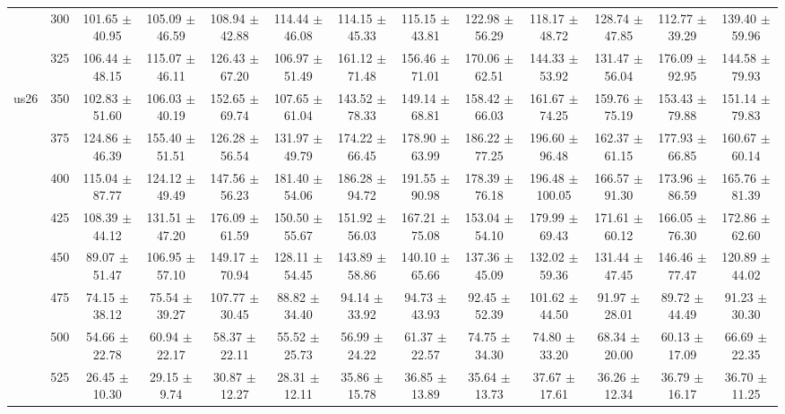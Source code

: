 \begin{table}[h]
{\begin{tabular}{
        ccccccccccccc}
 & 300& 101.65 $\pm$ 40.95& 105.09 $\pm$ 46.59& 108.94 $\pm$ 42.88& 114.44 $\pm$ 46.08& 114.15 $\pm$ 45.33& 115.15 $\pm$ 43.81& 122.98 $\pm$ 56.29& 118.17 $\pm$ 48.72& 128.74 $\pm$ 47.85& 112.77 $\pm$ 39.29& 139.40 $\pm$ 59.96 \\ 
 & 325& 106.44 $\pm$ 48.15& 115.07 $\pm$ 46.11& 126.43 $\pm$ 67.20& 106.97 $\pm$ 51.49& 161.12 $\pm$ 71.48& 156.46 $\pm$ 71.01& 170.06 $\pm$ 62.51& 144.33 $\pm$ 53.92& 131.47 $\pm$ 56.04& 176.09 $\pm$ 92.95& 144.58 $\pm$ 79.93 \\ 
\multirow{4}{*}{us26}& 350& 102.83 $\pm$ 51.60& 106.03 $\pm$ 40.19& 152.65 $\pm$ 69.74& 107.65 $\pm$ 61.04& 143.52 $\pm$ 78.33& 149.14 $\pm$ 68.81& 158.42 $\pm$ 66.03& 161.67 $\pm$ 74.25& 159.76 $\pm$ 75.19& 153.43 $\pm$ 79.88& 151.14 $\pm$ 79.83 \\ 
 & 375& 124.86 $\pm$ 46.39& 155.40 $\pm$ 51.51& 126.28 $\pm$ 56.54& 131.97 $\pm$ 49.79& 174.22 $\pm$ 66.45& 178.90 $\pm$ 63.99& 186.22 $\pm$ 77.25& 196.60 $\pm$ 96.48& 162.37 $\pm$ 61.15& 177.93 $\pm$ 66.85& 160.67 $\pm$ 60.14 \\ 
 & 400& 115.04 $\pm$ 87.77& 124.12 $\pm$ 49.49& 147.56 $\pm$ 56.23& 181.40 $\pm$ 54.06& 186.28 $\pm$ 94.72& 191.55 $\pm$ 90.98& 178.39 $\pm$ 76.18& 196.48 $\pm$ 100.05& 166.57 $\pm$ 91.30& 173.96 $\pm$ 86.59& 165.76 $\pm$ 81.39 \\ 
 & 425& 108.39 $\pm$ 44.12& 131.51 $\pm$ 47.20& 176.09 $\pm$ 61.59& 150.50 $\pm$ 55.67& 151.92 $\pm$ 56.03& 167.21 $\pm$ 75.08& 153.04 $\pm$ 54.10& 179.99 $\pm$ 69.43& 171.61 $\pm$ 60.12& 166.05 $\pm$ 76.30& 172.86 $\pm$ 62.60 \\ 
 & 450& 89.07 $\pm$ 51.47& 106.95 $\pm$ 57.10& 149.17 $\pm$ 70.94& 128.11 $\pm$ 54.45& 143.89 $\pm$ 58.86& 140.10 $\pm$ 65.66& 137.36 $\pm$ 45.09& 132.02 $\pm$ 59.36& 131.44 $\pm$ 47.45& 146.46 $\pm$ 77.47& 120.89 $\pm$ 44.02 \\ 
 & 475& 74.15 $\pm$ 38.12& 75.54 $\pm$ 39.27& 107.77 $\pm$ 30.45& 88.82 $\pm$ 34.40& 94.14 $\pm$ 33.92& 94.73 $\pm$ 43.93& 92.45 $\pm$ 52.39& 101.62 $\pm$ 44.50& 91.97 $\pm$ 28.01& 89.72 $\pm$ 44.49& 91.23 $\pm$ 30.30 \\ 
 & 500& 54.66 $\pm$ 22.78& 60.94 $\pm$ 22.17& 58.37 $\pm$ 22.11& 55.52 $\pm$ 25.73& 56.99 $\pm$ 24.22& 61.37 $\pm$ 22.57& 74.75 $\pm$ 34.30& 74.80 $\pm$ 33.20& 68.34 $\pm$ 20.00& 60.13 $\pm$ 17.09& 66.69 $\pm$ 22.35 \\ 
 & 525& 26.45 $\pm$ 10.30& 29.15 $\pm$ 9.74& 30.87 $\pm$ 12.27& 28.31 $\pm$ 12.11& 35.86 $\pm$ 15.78& 36.85 $\pm$ 13.89& 35.64 $\pm$ 13.73& 37.67 $\pm$ 17.61& 36.26 $\pm$ 12.34& 36.79 $\pm$ 16.17& 36.70 $\pm$ 11.25 \\ 

\end{tabular}}
\end{table}

